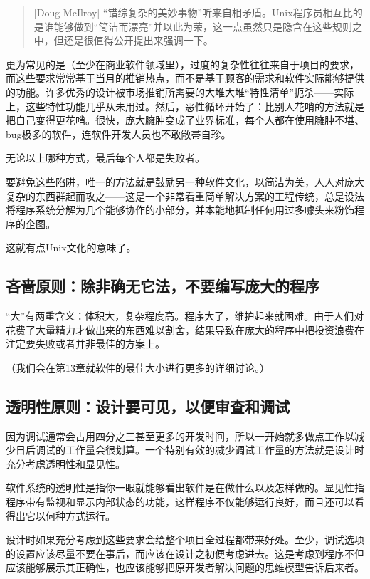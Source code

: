 \documentclass[12pt,oneside]{book}
\begin{document}
\begin{common-format}
\begin{quote}[Doug McIlroy]
“错综复杂的美妙事物”听来自相矛盾。Unix程序员相互比的是谁能够做到“简洁而漂亮”并以此为荣，这一点虽然只是隐含在这些规则之中，但还是很值得公开提出来强调一下。
\end{quote}    

更为常见的是（至少在商业软件领域里），过度的复杂性往往来自于项目的要求，而这些要求常常基于当月的推销热点，而不是基于顾客的需求和软件实际能够提供的功能。许多优秀的设计被市场推销所需要的大堆大堆“特性清单”扼杀——实际上，这些特性功能几乎从未用过。然后，恶性循环开始了：比别人花哨的方法就是把自己变得更花哨。很快，庞大臃肿变成了业界标准，每个人都在使用臃肿不堪、bug极多的软件，连软件开发人员也不敢敝帚自珍。

无论以上哪种方式，最后每个人都是失败者。

要避免这些陷阱，唯一的方法就是鼓励另一种软件文化，以简洁为美，人人对庞大复杂的东西群起而攻之——这是一个非常看重简单解决方案的工程传统，总是设法将程序系统分解为几个能够协作的小部分，并本能地抵制任何用过多噱头来粉饰程序的企图。
    
这就有点Unix文化的意味了。


\subsection{吝啬原则：除非确无它法，不要编写庞大的程序}
“大”有两重含义：体积大，复杂程度高。程序大了，维护起来就困难。由于人们对花费了大量精力才做出来的东西难以割舍，结果导致在庞大的程序中把投资浪费在注定要失败或者并非最佳的方案上。

（我们会在第13章就软件的最佳大小进行更多的详细讨论。）

\subsection{透明性原则：设计要可见，以便审查和调试}
因为调试通常会占用四分之三甚至更多的开发时间，所以一开始就多做点工作以减少日后调试的工作量会很划算。一个特别有效的减少调试工作量的方法就是设计时充分考虑透明性和显见性。

软件系统的透明性是指你一眼就能够看出软件是在做什么以及怎样做的。显见性指程序带有监视和显示内部状态的功能，这样程序不仅能够运行良好，而且还可以看得出它以何种方式运行。

设计时如果充分考虑到这些要求会给整个项目全过程都带来好处。至少，调试选项的设置应该尽量不要在事后，而应该在设计之初便考虑进去。这是考虑到程序不但应该能够展示其正确性，也应该能够把原开发者解决问题的思维模型告诉后来者。


\end{common-format}
\end{document}
